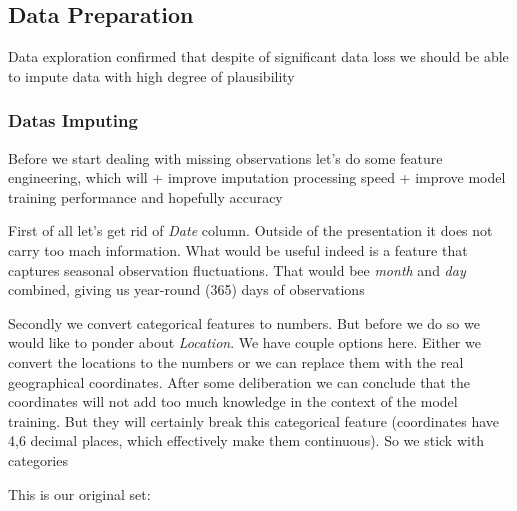 \hypertarget{data-preparation}{%
\subsection{Data Preparation}\label{data-preparation}}

Data exploration confirmed that despite of significant data loss we
should be able to impute data with high degree of plausibility

\hypertarget{datas-imputing}{%
\subsubsection{Datas Imputing}\label{datas-imputing}}

Before we start dealing with missing observations let's do some feature
engineering, which will + improve imputation processing speed + improve
model training performance and hopefully accuracy

First of all let's get rid of \emph{Date} column. Outside of the
presentation it does not carry too mach information. What would be
useful indeed is a feature that captures seasonal observation
fluctuations. That would bee \emph{month} and \emph{day} combined,
giving us year-round (365) days of observations

Secondly we convert categorical features to numbers. But before we do so
we would like to ponder about \emph{Location}. We have couple options
here. Either we convert the locations to the numbers or we can replace
them with the real geographical coordinates. After some deliberation we
can conclude that the coordinates will not add too much knowledge in the
context of the model training. But they will certainly break this
categorical feature (coordinates have 4,6 decimal places, which
effectively make them continuous). So we stick with categories

This is our original set:

